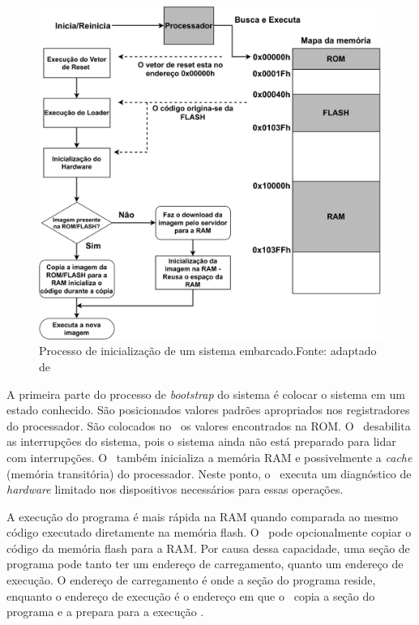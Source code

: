 \begin{figure}[H]
    \scriptsize
     \centering
     \includegraphics[scale=0.75]{dados/figuras/inicializacaoBoot.pdf}
     \caption{Processo de inicialização de um sistema embarcado.\newline Fonte: adaptado de \cite{Qing2003}}
     \label{fig:INICIALIZAÇÃO}
\end{figure}

A primeira parte do processo de \textit{bootstrap} do sistema é colocar o sistema em um estado conhecido. São posicionados valores padrões apropriados nos registradores do processador. São colocados no \stackp\ os valores encontrados na ROM. O \loader\ desabilita as interrupções do sistema, pois o sistema ainda não está preparado para lidar com interrupções. O \loader\ também inicializa a memória RAM e possivelmente a \textit{cache} (memória transitória) do processador. Neste ponto, o \loader\ executa um diagnóstico de \textit{hardware} limitado nos dispositivos necessários para essas operações.

A execução do programa é mais rápida na RAM quando comparada ao mesmo código executado diretamente na memória flash. O \loader\ pode opcionalmente copiar o código da memória flash para a RAM. Por causa dessa capacidade, uma seção de programa pode tanto ter um endereço de carregamento, quanto um endereço de execução. O endereço de carregamento é onde a seção do programa reside, enquanto o endereço de execução é o endereço em que o \loader\ copia a seção do programa e a prepara para a execução \cite{Qing2003}.


